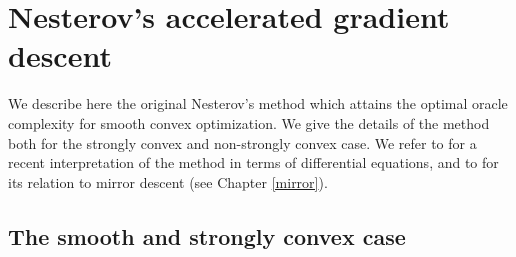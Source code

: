 \section{Nesterov's accelerated gradient descent} \label{sec:AGD}


We describe here the original Nesterov's method which attains the optimal oracle complexity for smooth convex optimization. We give the details of the method both for the strongly convex and non-strongly convex case. We refer to \cite{SBC14} for a recent interpretation of the method in terms of differential equations, and to \cite{AO14} for its relation to mirror descent (see Chapter \ref{mirror}).


\subsection{The smooth and strongly convex case}

